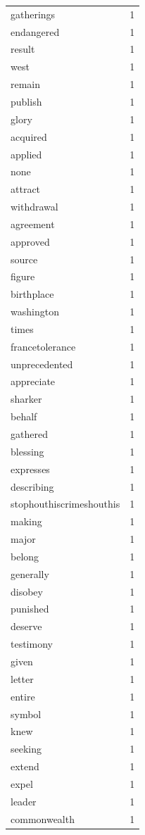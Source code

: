 \begin{tabular}{lr}
gatherings & 1 \\
endangered & 1 \\
result & 1 \\
west & 1 \\
remain & 1 \\
publish & 1 \\
glory & 1 \\
acquired & 1 \\
applied & 1 \\
none & 1 \\
attract & 1 \\
withdrawal & 1 \\
agreement & 1 \\
approved & 1 \\
source & 1 \\
figure & 1 \\
birthplace & 1 \\
washington & 1 \\
times & 1 \\
francetolerance & 1 \\
unprecedented & 1 \\
appreciate & 1 \\
sharker & 1 \\
behalf & 1 \\
gathered & 1 \\
blessing & 1 \\
expresses & 1 \\
describing & 1 \\
stophouthiscrimeshouthis & 1 \\
making & 1 \\
major & 1 \\
belong & 1 \\
generally & 1 \\
disobey & 1 \\
punished & 1 \\
deserve & 1 \\
testimony & 1 \\
given & 1 \\
letter & 1 \\
entire & 1 \\
symbol & 1 \\
knew & 1 \\
seeking & 1 \\
extend & 1 \\
expel & 1 \\
leader & 1 \\
commonwealth & 1 \\

\end{tabular}
